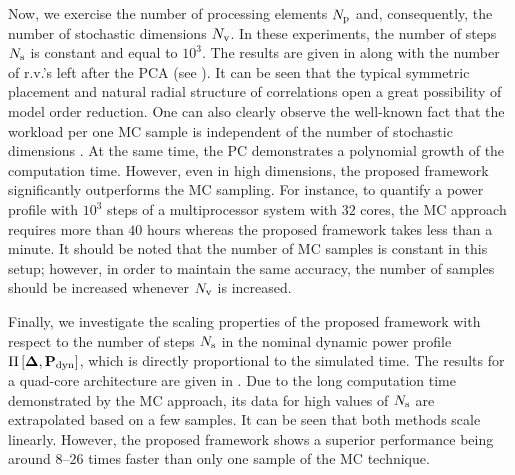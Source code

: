 
Now, we exercise the number of processing elements ${N_\text{p}}$ and, consequently, the number of stochastic dimensions ${N_\text{v}}$. In these experiments, the number of steps $N_\text{s}$ is constant and equal to $10^3$. The results are given in  along with the number of r.v.'s left after the PCA (see ). It can be seen that the typical symmetric placement and natural radial structure of correlations \cite{cheng2011} open a great possibility of model order reduction. One can also clearly observe the well-known fact that the workload per one MC sample is independent of the number of stochastic dimensions \cite{maitre2010}. At the same time, the PC demonstrates a polynomial growth \cite{heiss2008} of the computation time. However, even in high dimensions, the proposed framework significantly outperforms the MC sampling. For instance, to quantify a power profile with $10^3$ steps of a multiprocessor system with $32$ cores, the MC approach requires more than $40$ hours whereas the proposed framework takes less than a minute. It should be noted that the number of MC samples is constant in this setup; however, in order to maintain the same accuracy, the number of samples should be increased whenever ${N_\text{v}}$ is increased.

Finally, we investigate the scaling properties of the proposed framework with respect to the number of steps $N_\text{s}$ in the nominal dynamic power profile $\prof{\mP_\dyn}$, which is directly proportional to the simulated time. The results for a quad-core architecture are given in . Due to the long computation time demonstrated by the MC approach, its data for high values of $N_\text{s}$ are extrapolated based on a few samples. It can be seen that both methods scale linearly. However, the proposed framework shows a superior performance being around $8$--$26$ times faster than only one sample of the MC technique.
